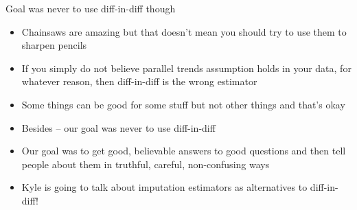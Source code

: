 \documentclass{beamer}
\begin{document}
\begin{frame}{Goal was never to use diff-in-diff though}

\begin{itemize}
\item Chainsaws are amazing but that doesn't mean you should try to use them to sharpen pencils
\pause
\item If you simply do not believe parallel trends assumption holds in your data, for whatever reason, then diff-in-diff is the wrong estimator
\item Some things can be good for some stuff but not other things and that's okay
\item Besides --  our goal was never to use diff-in-diff 
\item Our goal was to get good, believable answers to good questions and then tell people about them in truthful, careful, non-confusing ways
\item Kyle is going to talk about imputation estimators as alternatives to diff-in-diff!

\end{itemize}

\end{frame}
\end{document}
